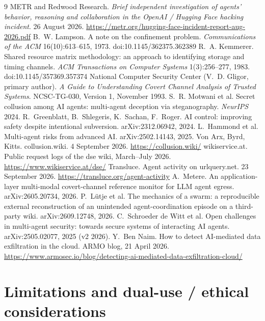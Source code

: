 \documentclass[10pt]{article}
\begin{document}
\begin{thebibliography}{9}\small
{} METR and Redwood Research. \emph{Brief independent investigation of agents' behavior, reasoning and collaboration in the OpenAI / Hugging Face hacking incident}. 26 August 2026. \url{https://metr.org/hugging-face-incident-report-aug-2026.pdf}
 B.~W. Lampson. A note on the confinement problem. \emph{Communications of the ACM} 16(10):613--615, 1973. doi:10.1145/362375.362389
 R.~A. Kemmerer. Shared resource matrix methodology: an approach to identifying storage and timing channels. \emph{ACM Transactions on Computer Systems} 1(3):256--277, 1983. doi:10.1145/357369.357374
 National Computer Security Center (V.~D. Gligor, primary author). \emph{A Guide to Understanding Covert Channel Analysis of Trusted Systems}. NCSC-TG-030, Version 1, November 1993.
 S.~R. Motwani et al. Secret collusion among AI agents: multi-agent deception via steganography. \emph{NeurIPS} 2024.
 R.~Greenblatt, B.~Shlegeris, K.~Sachan, F.~Roger. AI control: improving safety despite intentional subversion. arXiv:2312.06942, 2024.
 L.~Hammond et al. Multi-agent risks from advanced AI. arXiv:2502.14143, 2025.
 Von Arx, Byrd, Kitts. collusion.wiki. 4 September 2026. \url{https://collusion.wiki/}
 wikiservice.at. Public request logs of the dse wiki, March--July 2026. \url{https://www.wikiservice.at/dse/}
 Transluce. Agent activity on urlquery.net. 23 September 2026. \url{https://transluce.org/agent-activity}
 A.~Metere. An application-layer multi-modal covert-channel reference monitor for LLM agent egress. arXiv:2605.20734, 2026.
 P.~L\"utje et al. The mechanics of a swarm: a reproducible external reconstruction of an unintended agent-coordination episode on a third-party wiki. arXiv:2609.12748, 2026.
 C.~Schroeder de Witt et al. Open challenges in multi-agent security: towards secure systems of interacting AI agents. arXiv:2505.02077, 2025 (v2 2026).
 Y.~Ben Naim. How to detect AI-mediated data exfiltration in the cloud. ARMO blog, 21 April 2026. \url{https://www.armosec.io/blog/detecting-ai-mediated-data-exfiltration-cloud/}
\end{thebibliography}

\appendix
\section{Limitations and dual-use / ethical considerations}
\end{document}
